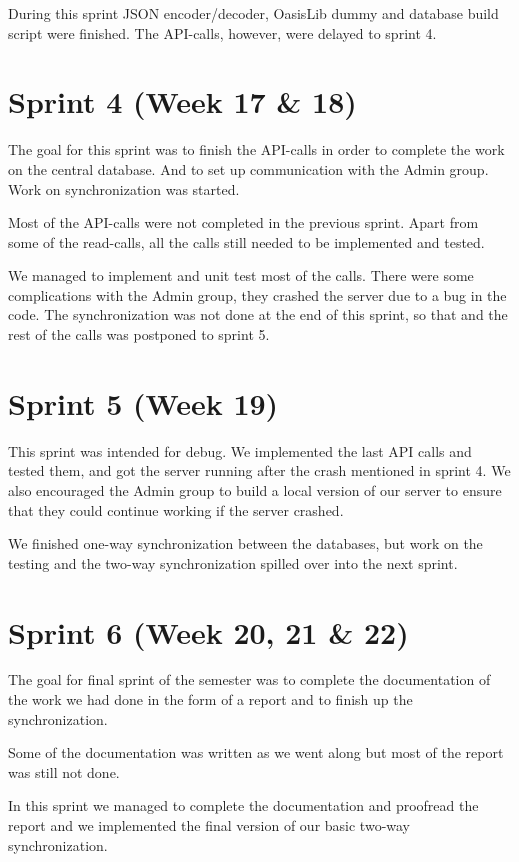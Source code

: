 During this sprint JSON encoder/decoder, OasisLib dummy and database build script were finished. The API-calls, however, were delayed to sprint 4.

\section{Sprint 4 (Week 17 \& 18)}
The goal for this sprint was to finish the API-calls in order to complete the work on the central database. And to set up communication with the Admin group. Work on synchronization was started.

Most of the API-calls were not completed in the previous sprint. Apart from some of the read-calls, all the calls still needed to be implemented and tested. 

We managed to implement and unit test most of the calls. There were some complications with the Admin group, they crashed the server due to a bug in the code. The synchronization was not done at the end of this sprint, so that and the rest of the calls was postponed to sprint 5.  

\section{Sprint 5 (Week 19)}
This sprint was intended for debug. We implemented the last API calls and tested them, and got the server running after the crash mentioned in sprint 4. We also encouraged the Admin group to build a local version of our server to ensure that they could continue working if the server crashed.

We finished one-way synchronization between the databases, but work on the testing and the two-way synchronization spilled over into the next sprint.

\section{Sprint 6 (Week 20, 21 \& 22)}
The goal for final sprint of the semester was to complete the documentation of the work we had done in the form of a report and to finish up the synchronization.

Some of the documentation was written as we went along but most of the report was still not done. 

In this sprint we managed to complete the documentation and proofread the report and we implemented the final version of our basic two-way synchronization.

